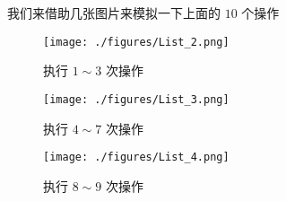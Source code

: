 我们来借助几张图片来模拟一下上面的 $10$ 个操作

\begin{figure}[ht]
\centering
\texttt{[image: ./figures/List\_2.png]}
\caption{执行 $1\sim3$ 次操作} \label{List_fig2}
\end{figure}

\begin{figure}[ht]
\centering
\texttt{[image: ./figures/List\_3.png]}
\caption{执行 $4\sim7$ 次操作} \label{List_fig3}
\end{figure}

\begin{figure}[ht]
\centering
\texttt{[image: ./figures/List\_4.png]}
\caption{执行 $8\sim9$ 次操作} \label{List_fig4}
\end{figure}